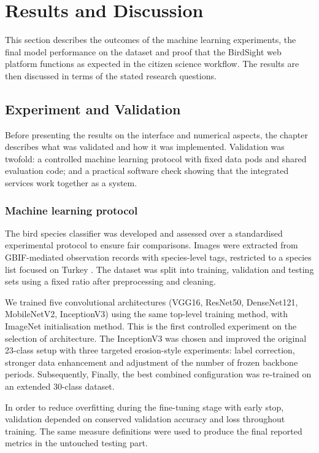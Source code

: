 \section{Results and Discussion}

This section describes the outcomes of the machine learning experiments, 
the final model performance on the dataset and proof that the BirdSight 
web platform functions as expected in the citizen science workflow. The 
results are then discussed in terms of the stated research questions.

\subsection{Experiment and Validation}

Before presenting the results on the interface and numerical aspects, the chapter 
describes what was validated and how it was implemented. Validation was twofold: 
a controlled machine learning protocol with fixed data pods and shared evaluation 
code; and a practical software check showing that the integrated services work 
together as a system.

\subsubsection{Machine learning protocol}

The bird species classifier was developed and assessed over a standardised experimental 
protocol to ensure fair comparisons. Images were extracted from GBIF-mediated observation 
records with species-level tags, restricted to a species list focused on Turkey 
\cite{gbif2025,ebird2025}. The dataset was split into training, validation and testing 
sets using a fixed ratio after preprocessing and cleaning.

We trained five convolutional architectures (VGG16, ResNet50, DenseNet121, MobileNetV2, 
InceptionV3) using the same top-level training method, with ImageNet initialisation method. 
This is the first controlled experiment on the selection of architecture. The InceptionV3 
was chosen and improved the original 23-class setup with three targeted erosion-style 
experiments: label correction, stronger data enhancement and adjustment of the number of 
frozen backbone periods. Subsequently, Finally, the best combined configuration was re-trained 
on an extended 30-class dataset.

In order to reduce overfitting during the fine-tuning stage with early stop, validation 
depended on conserved validation accuracy and loss throughout training. The same measure 
definitions were used to produce the final reported metrics in the untouched testing part.

